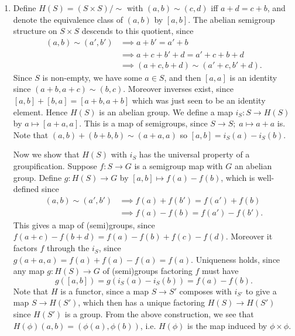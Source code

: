 \documentclass{report}
\begin{document}
\begin{enumerate}[label=\textbf{1.5.\Alph*.}]
	\item Define $H(S)=(S\times S)/\sim$ with $(a,b)\sim(c,d)$ iff $a+d=c+b$,
	      and denote the equivalence class of $(a,b)$ by $[a,b]$. The abelian
	      semigroup structure on $S\times S$ descends to this quotient, since
	      \begin{align*}
		      (a,b)\sim(a',b')
		       & \implies a+b'=a'+b                 \\
		       & \implies a+c+b'+d = a'+c+b+d       \\
		       & \implies (a+c,b+d)\sim(a'+c,b'+d).
	      \end{align*}
	      Since $S$ is non-empty, we have some $a\in S$, and then $[a,a]$ is
	      an identity since $(a+b,a+c)\sim(b,c)$. Moreover inverses exist,
	      since $[a,b]+[b,a]=[a+b,a+b]$ which was just seen to be an identity
	      element. Hence $H(S)$ is an abelian group. We define a map
	      $i_S:S\to H(S)$ by $a\mapsto[a+a,a]$. This is a map of semigroups,
	      since $S\to S;\;a\mapsto a+a$ is. Note that $(a,b)+(b+b,b)\sim(a+a,a)$
	      so $[a,b]=i_S(a)-i_S(b)$.

	      Now we show that $H(S)$ with $i_S$ has the universal property of
	      a groupification. Suppose $f:S\to G$ is a semigroup map with $G$ an
	      abelian group. Define $g:H(S)\to G$ by $[a,b]\mapsto f(a)-f(b)$,
	      which is well-defined since
	      \begin{align*}
		      (a,b)\sim(a',b')
		       & \implies f(a)+f(b') = f(a')+f(b)  \\
		       & \implies f(a)-f(b) = f(a')-f(b').
	      \end{align*}
	      This gives a map of (semi)groups, since
	      $f(a+c)-f(b+d)=f(a)-f(b)+f(c)-f(d)$. Moreover it factors $f$ through
	      the $i_S$, since $g(a+a,a)=f(a)+f(a)-f(a)=f(a)$. Uniqueness holds,
	      since any map $g:H(S)\to G$ of (semi)groups factoring $f$ must have
	      \begin{equation*}
		      g([a,b]) = g(i_S(a)-i_S(b)) = f(a)-f(b).
	      \end{equation*}
	      Note that $H$ is a functor, since a map $S\to S'$ composes with
	      $i_{S'}$ to give a map $S\to H(S')$, which then has a unique
	      factoring $H(S)\to H(S')$ since $H(S')$ is a group. From the above
	      construction, we see that $H(\phi)(a,b)=(\phi(a),\phi(b))$, i.e.
	      $H(\phi)$ is the map induced by $\phi\times\phi$.


\end{enumerate}
\end{document}
